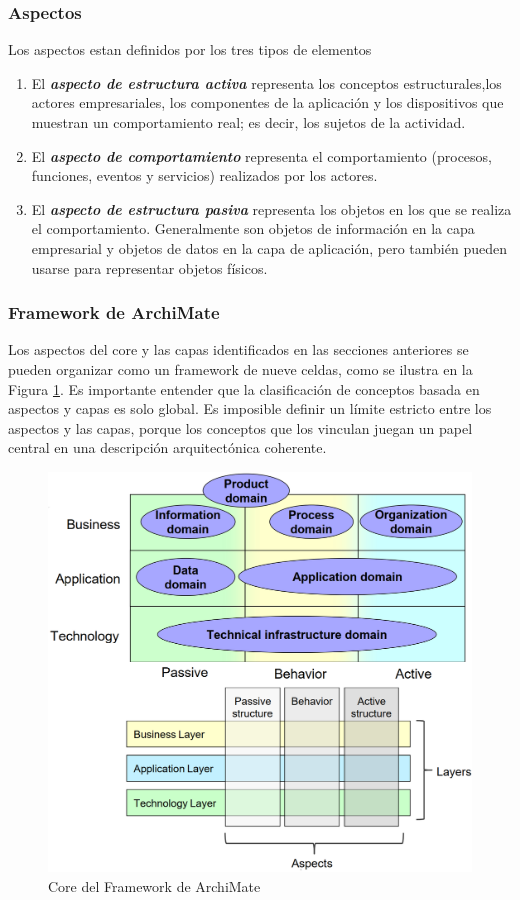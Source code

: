 \subsubsection{Aspectos}
Los aspectos estan definidos por los tres tipos de elementos 
\begin{enumerate}
\item El \textbf{\textit{aspecto de estructura activa}}  representa los conceptos estructurales,los actores empresariales, los componentes de la aplicación y los dispositivos que muestran un comportamiento real; es decir, los sujetos de la actividad.
\item El \textbf{\textit{aspecto de comportamiento}} representa el comportamiento (procesos, funciones, eventos y servicios) realizados por los actores. 
\item El \textbf{\textit{aspecto de estructura pasiva}} representa los objetos en los que se realiza el comportamiento. Generalmente son objetos de información en la capa empresarial y objetos de datos en la capa de aplicación, pero también pueden usarse para representar objetos físicos.
\end{enumerate}

\newpage
\subsubsection{Framework de ArchiMate}
Los aspectos del core y las  capas identificados en las secciones anteriores se pueden organizar como un framework de nueve celdas, como se ilustra en la Figura \ref{core}. Es importante entender que la clasificación de conceptos basada en aspectos y capas es solo global. Es imposible definir un límite estricto entre los aspectos y las capas, porque los conceptos que los vinculan juegan un papel central en una descripción arquitectónica coherente\cite{ArchiMate3.0.1}.

\begin{figure}[h!]
	\centering
	\includegraphics[width=1\linewidth]{ARQUITECTURA/imgs/core}
	\caption{Core del Framework de ArchiMate}
	\label{core}
\end{figure}


